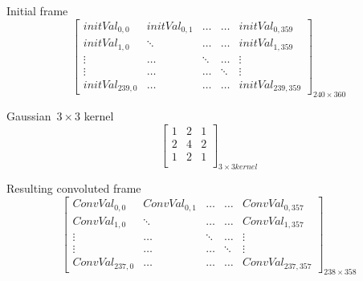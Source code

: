 \noindent\begin{minipage}{.3\textwidth}
Initial frame
\[
\begin{bmatrix}

initVal_{0,0} & initVal_{0,1} & \ldots & \ldots & initVal_{0,359}\\

initVal_{1,0} & \ddots & \ldots & \ldots & initVal_{1,359}\\

\vdots & \ldots & \ddots & \ldots & \vdots\\

\vdots & \ldots & \ldots & \ddots & \vdots\\

initVal_{239,0} & \ldots & \ldots  & \ldots & initVal_{239,359}

\end{bmatrix}_{240\times 360}
\]
\end{minipage}\hfill
\begin{minipage}{.3\textwidth}
Gaussian~$3\times 3$ kernel
\[
\begin{bmatrix}

1 & 2 & 1\\

2 & 4 & 2\\

1 & 2 & 1\\

\end{bmatrix}_{3\times 3 kernel}
\]
\end{minipage}

\vspace{10mm}

Resulting convoluted frame
\[
\begin{bmatrix}

ConvVal_{0,0} & ConvVal_{0,1} & \ldots & \ldots & ConvVal_{0,357}\\

ConvVal_{1,0} & \ddots & \ldots & \ldots & ConvVal_{1,357}\\

\vdots & \ldots & \ddots & \ldots & \vdots\\

\vdots & \ldots & \ldots & \ddots & \vdots\\

ConvVal_{237,0} & \ldots & \ldots  & \ldots & ConvVal_{237,357}

\end{bmatrix}_{238\times 358}
\]




